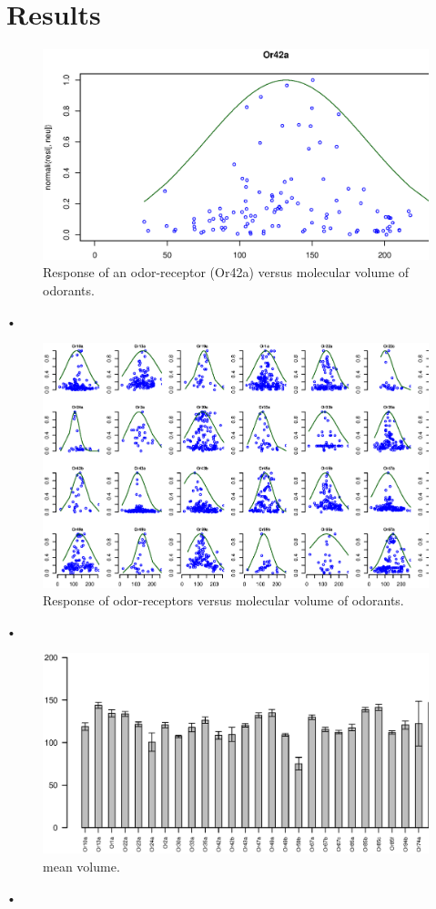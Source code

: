 \documentclass[11pt]{paper} %
\begin{document}
\section{Results}


\begin{figure}
\includegraphics[width=\textwidth]{fig/vol-res-Or42a}
\caption{Response of an odor-receptor (Or42a) versus molecular volume of odorants.}
\label{fig:Or42a}
\end{figure}•

\begin{figure}
\includegraphics[width=\textwidth]{fig/vol-res}
\caption{Response of odor-receptors  versus molecular volume of odorants.}
\label{fig:vol-res}
\end{figure}•

\begin{figure}
\includegraphics[width=\textwidth]{fig/mean-vol}
\caption{mean volume.}
\end{figure}•
\end{document}
